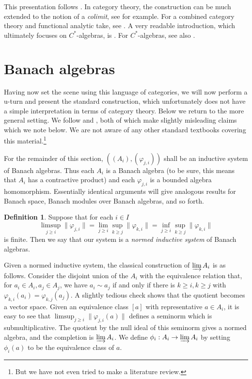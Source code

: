 \documentclass[a4paper,11pt]{article}
\newcommand{\indlim}{\varinjlim}
\theoremstyle{definition}
\newtheorem{definition}[lemma]{Definition}
\begin{document}
This presentation follows \cite[Section~6.2]{rll}.  In category theory, the construction can be
much extended to the notion of a \emph{colimit}, see \cite[Chapter~5]{leinster} for example.  For
a combined category theory and functional analytic take, see \cite{cas}.
A very readable introduction, which ultimately focuses on $C^*$-algebras, is \cite[Appendix~L]{wo}.
For $C^*$-algebras, see also \cite[Section~II.8.2]{blenc}.



\section{Banach algebras}

Having now set the scene using this language of categories, we will now perform a u-turn and present
the standard construction, which unfortunately does not have a simple interpretation in terms of
category theory.  Below we return to the more general setting.  We follow
\cite[Definition~1.3.4]{palmer} and \cite[Section~3.3]{blackadar}, both of which make slightly
misleading claims which we note below.  We are not aware of any other standard textbooks covering
this material.\footnote{But we have not even tried to make a literature review.}

For the remainder of this section, $((A_i), (\varphi_{j,i}))$ shall be an inductive system of Banach
algebras.  Thus each $A_i$ is a Banach algebra (to be sure, this means that $A_i$ has a contractive
product) and each $\varphi_{j,i}$ is a bounded algebra homomorphism.  Essentially identical
arguments will give analogous results for Banach space, Banach modules over Banach algebras, and so
forth.

\begin{definition}\label{defn:1}
Suppose that for each $i\in I$
\[ \limsup_{j\geq i} \|\varphi_{j,i}\| = \lim_{j\geq i} \sup_{k\geq j} \|\varphi_{k,i}\|
=
\inf_{j\geq i} \sup_{k\geq j} \|\varphi_{k,i}\| \]
is finite.  Then we say that our system is a \emph{normed inductive system} of Banach algebras.
\end{definition}

Given a normed inductive system, the classical construction of $\indlim A_i$ is as follows.
Consider the disjoint union of the $A_i$ with the equivalence relation that, for $a_i\in A_i,
a_j\in A_j$, we have $a_i \sim a_j$ if and only if there is $k\geq i, k\geq j$ with
$\varphi_{k,i}(a_i) = \varphi_{k,j}(a_j)$.  A slightly tedious check shows that the quotient becomes
a vector space.  Given an equivalence class $[a]$ with representative $a\in A_i$, it is easy to see
that $\limsup_{j\geq i} \|\varphi_{j,i}(a)\|$ defines a seminorm which is submultiplicative.
The quotient by the null ideal of this seminorm gives a normed algebra, and the completion is
$\indlim A_i$.  We define $\phi_i:A_i \rightarrow \indlim A_i$ by setting $\phi_i(a)$ to
be the equivalence class of $a$.
\end{document}
